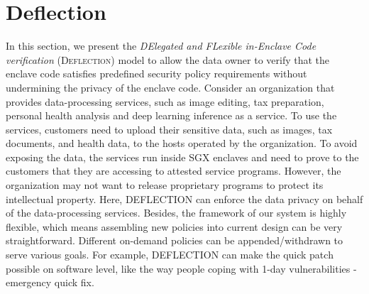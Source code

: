 \section{Deflection}\label{sec-CAT}


In this section, we present the \textit{DElegated and  FLexible  in-Enclave  Code verification} (\textsc{Deflection}) model to allow the data owner to verify that the enclave code satisfies predefined security policy requirements without undermining the privacy of the enclave code.
Consider an organization that provides data-processing services, such as image editing, tax preparation, personal health analysis and deep learning inference as a service. To use the services, customers need to upload their sensitive data, such as images, tax documents, and health data, to the hosts operated by the organization. To avoid exposing the data, the services run inside SGX enclaves and need to prove to the customers that they are accessing to attested service programs. However, the organization may not want to release proprietary programs to protect its intellectual property. Here, DEFLECTION can enforce the data privacy on behalf of the data-processing services.
Besides, the framework of our system is highly flexible, which means assembling new policies into current design can be very straightforward. Different on-demand policies can be appended/withdrawn to serve various goals. For example, DEFLECTION can make the quick patch possible on software level, like the way people coping with 1-day vulnerabilities - emergency quick fix. 

 




